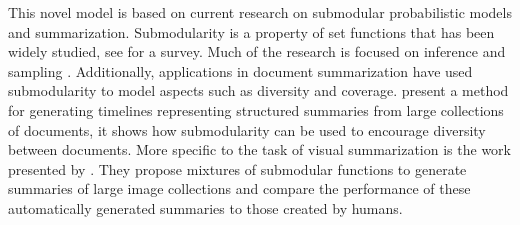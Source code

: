 This novel model is based on current research on submodular probabilistic models and summarization. Submodularity is a property of set functions that has been widely studied, see \cite{krause14submodular} for a survey. Much of the research is focused on inference \citep{djolonga14variational, djolonga15scalable} and sampling \citep{gotovos15sampling}. Additionally, applications in document summarization have used submodularity to model aspects such as diversity and coverage. \citet{Shahaf2012, Shahaf2013} present a method for generating timelines representing structured summaries from large collections of documents, it shows how submodularity can be used to encourage diversity between documents. More specific to the task of visual summarization is the work presented by \citet{Tschiatschek2014}. They propose mixtures of submodular functions to generate summaries of large image collections and compare the performance of these automatically generated summaries to those created by humans.

